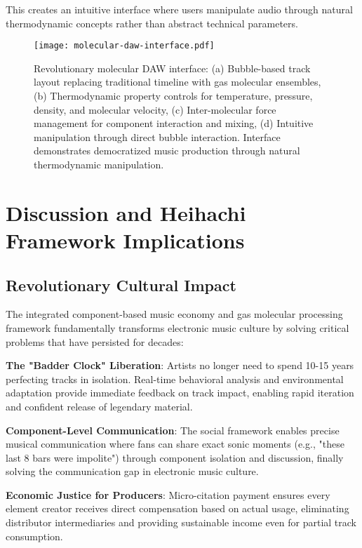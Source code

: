 \documentclass[12pt,a4paper]{article}
\begin{document}
This creates an intuitive interface where users manipulate audio through natural thermodynamic concepts rather than abstract technical parameters.

\begin{figure}[h]
\centering
\texttt{[image: molecular-daw-interface.pdf]}
\caption{Revolutionary molecular DAW interface: (a) Bubble-based track layout replacing traditional timeline with gas molecular ensembles, (b) Thermodynamic property controls for temperature, pressure, density, and molecular velocity, (c) Inter-molecular force management for component interaction and mixing, (d) Intuitive manipulation through direct bubble interaction. Interface demonstrates democratized music production through natural thermodynamic manipulation.}
\label{fig:molecular_daw}
\end{figure}

\section{Discussion and Heihachi Framework Implications}

\subsection{Revolutionary Cultural Impact}

The integrated component-based music economy and gas molecular processing framework fundamentally transforms electronic music culture by solving critical problems that have persisted for decades:

\textbf{The "Badder Clock" Liberation}: Artists no longer need to spend 10-15 years perfecting tracks in isolation. Real-time behavioral analysis and environmental adaptation provide immediate feedback on track impact, enabling rapid iteration and confident release of legendary material.

\textbf{Component-Level Communication}: The social framework enables precise musical communication where fans can share exact sonic moments (e.g., "these last 8 bars were impolite") through component isolation and discussion, finally solving the communication gap in electronic music culture.

\textbf{Economic Justice for Producers}: Micro-citation payment ensures every element creator receives direct compensation based on actual usage, eliminating distributor intermediaries and providing sustainable income even for partial track consumption.
\end{document}
